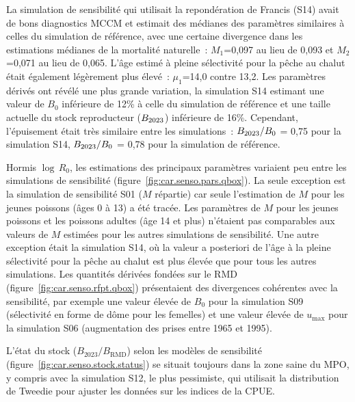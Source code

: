 \documentclass[11pt]{book}
\newcommand{\Bmsy}{B_\text{RMD}}
\newcommand{\pc}{\%}
\begin{document}
La simulation de sensibilit\'{e} qui utilisait la repond\'{e}ration de Francis (S14) avait de bons diagnostics MCCM et estimait des m\'{e}dianes des param\`{e}tres similaires \`{a} celles du simulation de r\'{e}f\'{e}rence, avec une certaine divergence dans les estimations m\'{e}dianes de la mortalit\'{e} naturelle~: $M_1$=0,097 au lieu de 0,093 et $M_2$=0,071 au lieu de 0,065.
L'\^{a}ge estim\'{e} \`{a} pleine s\'{e}lectivit\'{e} pour la p\^{e}che au chalut \'{e}tait \'{e}galement l\'{e}g\`{e}rement plus \'{e}lev\'{e}~: $\mu_1$=14,0 contre 13,2.
Les param\`{e}tres d\'{e}riv\'{e}s ont r\'{e}v\'{e}l\'{e} une plus grande variation, la simulation S14 estimant une valeur de $B_0$ inf\'{e}rieure de 12\pc{} \`{a} celle du simulation de r\'{e}f\'{e}rence et une taille actuelle du stock reproducteur ($B_{2023}$) inf\'{e}rieure de 16\pc{}. 
Cependant, l'\'{e}puisement \'{e}tait tr\`{e}s similaire entre les simulations~: $B_{2023}/B_0$ = 0,75 pour la simulation S14, $B_{2023}/B_0$ = 0,78 pour la simulation de r\'{e}f\'{e}rence.

Hormis $\log\,R_0$, les estimations des principaux param\`{e}tres variaient peu entre les  simulations de sensibilit\'{e} (figure~\ref{fig:car.senso.pars.qbox}).
La seule exception est la simulation de sensibilit\'{e} S01 ($M$ r\'{e}partie) car seule l'estimation de $M$ pour les jeunes poissons (\^{a}ges 0 \`{a} 13) a \'{e}t\'{e} trac\'{e}e.
Les param\`{e}tres de $M$ pour les jeunes poissons et les poissons adultes (\^{a}ge 14 et plus) n'\'{e}taient pas comparables aux valeurs de $M$ estim\'{e}es pour les autres simulations de sensibilit\'{e}.
Une autre exception \'{e}tait la simulation S14, o\`{u} la valeur a posteriori de l'\^{a}ge \`{a} la pleine s\'{e}lectivit\'{e} pour la p\^{e}che au chalut est plus \'{e}lev\'{e}e que pour tous les autres simulations.
Les quantit\'{e}s d\'{e}riv\'{e}es fond\'{e}es sur le RMD (figure~\ref{fig:car.senso.rfpt.qbox}) pr\'{e}sentaient des divergences coh\'{e}rentes avec la sensibilit\'{e}, par exemple une valeur \'{e}lev\'{e}e de $B_0$ pour la simulation S09 (s\'{e}lectivit\'{e} en forme de d\^{o}me pour les femelles) et une valeur \'{e}lev\'{e}e de $u_\text{max}$ pour la simulation S06 (augmentation des prises entre 1965 et 1995).

L'\'{e}tat du stock ($B_{2023}/\Bmsy$) selon les mod\`{e}les de sensibilit\'{e} (figure~\ref{fig:car.senso.stock.status}) se situait toujours dans la zone saine du MPO, y compris avec la simulation S12, le plus pessimiste, qui utilisait la distribution de Tweedie pour ajuster les donn\'{e}es sur les indices de la CPUE.
\end{document}
